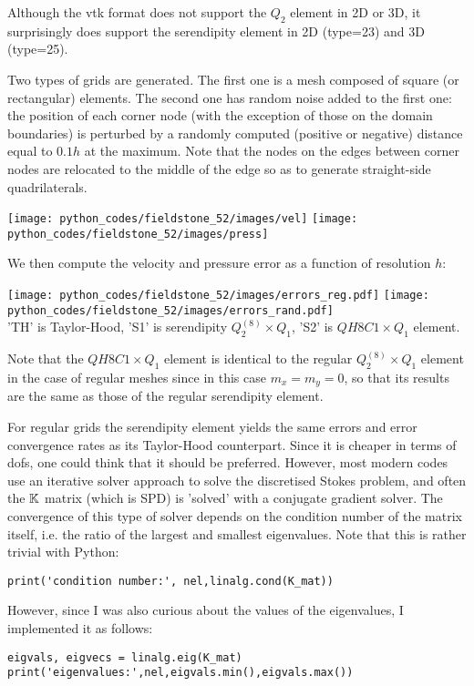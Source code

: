 Although the vtk format does not support the $Q_2$ element in 2D or 3D, it surprisingly does
support the serendipity element in 2D (type=23) and 3D (type=25).

Two types of grids are generated. The first one is a mesh composed of square (or rectangular)
elements. The second one has random noise added to the first one: the position of each corner 
node (with the exception of those on the domain boundaries) is perturbed by a randomly computed 
(positive or negative) distance equal to $0.1h$ at the maximum. Note that the nodes
on the edges between corner nodes are relocated to the middle of the edge so as to generate
straight-side quadrilaterals.

\begin{center}
\texttt{[image: python\_codes/fieldstone\_52/images/vel]}
\texttt{[image: python\_codes/fieldstone\_52/images/press]}
\end{center}


We then compute the velocity and pressure error as a function of resolution $h$:

\begin{center}
\texttt{[image: python\_codes/fieldstone\_52/images/errors\_reg.pdf]}
\texttt{[image: python\_codes/fieldstone\_52/images/errors\_rand.pdf]}\\
{\captionfont 'TH' is Taylor-Hood, 'S1' is serendipity $Q_2^{(8)}\times Q_1$, 'S2' is $QH8C1\times Q_1$ element.}
\end{center}

Note that the $QH8C1\times Q_1$ element is identical to the regular $Q_2^{(8)}\times Q_1$ element 
in the case of regular meshes since in this case $m_x=m_y=0$, so that its results are the same as those 
of the regular serendipity element. 

For regular grids the serendipity element yields the same errors and error convergence 
rates as its Taylor-Hood counterpart. Since it is cheaper in terms of dofs, 
one could think that it should be preferred. However, most modern codes 
use an iterative solver approach to solve the discretised Stokes problem, and 
often the ${\mathbb{K}}$ matrix (which is SPD) is 'solved' with a conjugate gradient solver.  
The convergence of this type of solver depends on the condition number of the matrix
itself, i.e. the ratio of the largest and smallest eigenvalues. 
Note that this is rather trivial with Python:

\begin{lstlisting}
print('condition number:', nel,linalg.cond(K_mat))
\end{lstlisting}
However, since I was also curious about the values of the eigenvalues, I implemented 
it as follows:
\begin{lstlisting}
eigvals, eigvecs = linalg.eig(K_mat)
print('eigenvalues:',nel,eigvals.min(),eigvals.max())
\end{lstlisting}

